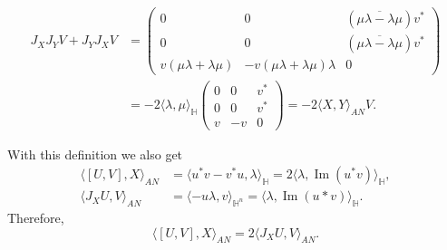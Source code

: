 \documentclass[12pt, a4paper]{amsart}
\renewcommand{\H}{\mathbb{H}}
\renewcommand{\Im}{\operatorname{Im}}
\theoremstyle{remark}
\begin{document}
\[
\begin{aligned}
J_X J_Y V+J_Y J_X V
&{}=\left(
\begin{array}{cc|c}
	0 & 0 & (\overline{\mu\lambda-\lambda\mu})v^{*} \\
	0 & 0 & (\overline{\mu\lambda-\lambda\mu})v^{*} \\
	\hline
	v(\mu\lambda+\lambda\mu) & -v(\mu\lambda+\lambda\mu)\lambda & 0
\end{array}
\right)\\
&{}=-2\langle\lambda,\mu\rangle_{\H} \left(
\begin{array}{cc|c}
	0 & 0 & v^{*} \\
	0 & 0 & v^{*} \\
	\hline
	v  & -v & 0
\end{array}
\right)
=-2\langle X,Y\rangle_{AN} V.
\end{aligned}
\]

With this definition we also get
\[
\begin{aligned}
\langle[U,V],X\rangle_{AN}
&{}=\langle u^*v-v^*u,\lambda\rangle_{\H}
=2\langle\lambda,\Im(u^*v)\rangle_\H,\\
\langle J_X U,V\rangle_{AN}
&{}=\langle -u\lambda,v\rangle_{\H^n}
=\langle\lambda,\Im(u*v)\rangle_\H.
\end{aligned}
\]
Therefore,
\[
\langle[U,V],X\rangle_{AN}=2\langle J_X U,V\rangle_{AN}.
\]
\end{document}
